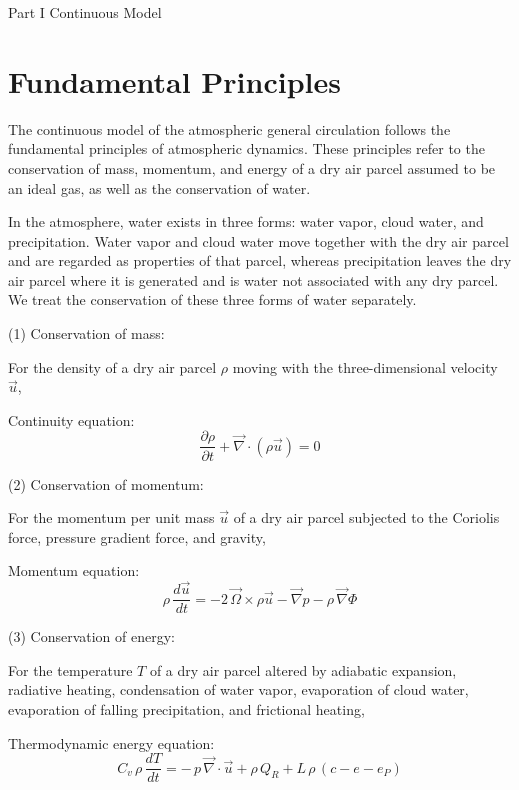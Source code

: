 \documentclass[12pt,openany]{book}
\begin{document}
\newpage

Part I Continuous Model

\chapter{Fundamental Principles}

The continuous model of the atmospheric general circulation follows
the fundamental principles of atmospheric dynamics. These principles
refer to the conservation of mass, momentum, and energy of a dry air
parcel assumed to be an ideal gas, as well as the conservation of
water.

In the atmosphere, water exists in three forms: water vapor, cloud
water, and precipitation. Water vapor and cloud water move together
with the dry air parcel and are regarded as properties of that parcel,
whereas precipitation leaves the dry air parcel where it is generated
and is water not associated with any dry parcel. We treat the
conservation of these three forms of water separately.

(1) Conservation of mass:

For the density of a dry air parcel $\rho$ moving with the three-dimensional
velocity $\vec{u}$,

Continuity equation:
\begin{equation}
\frac{\partial \rho}{\partial t}
+ \vec{\nabla} \cdot ( \rho \vec{u} )
= 0
\tag{1.1}
\label{eq:1.1}
\end{equation}

(2) Conservation of momentum:

For the momentum per unit mass $\vec{u}$ of a dry air parcel subjected to the
Coriolis force, pressure gradient force, and gravity,

Momentum equation:
\begin{equation}
\rho \, \frac{d \vec{u}}{dt}
= - 2 \, \vec{\Omega} \times \rho \vec{u}
  - \vec{\nabla} p
  - \rho \, \vec{\nabla} \Phi
\tag{1.2}
\label{eq:1.2}
\end{equation}

(3) Conservation of energy:

For the temperature $T$ of a dry air parcel altered by adiabatic
expansion, radiative heating, condensation of water vapor, evaporation
of cloud water, evaporation of falling precipitation, and frictional
heating,

Thermodynamic energy equation:
\begin{equation}
C_v \,\rho \,\frac{dT}{dt}
= -\, p \,\vec{\nabla} \cdot \vec{u}
  + \rho \, Q_R
  + L \,\rho \,( c - e - e_P )
\tag{1.3}
\label{eq:1.3}
\end{equation}
\end{document}
